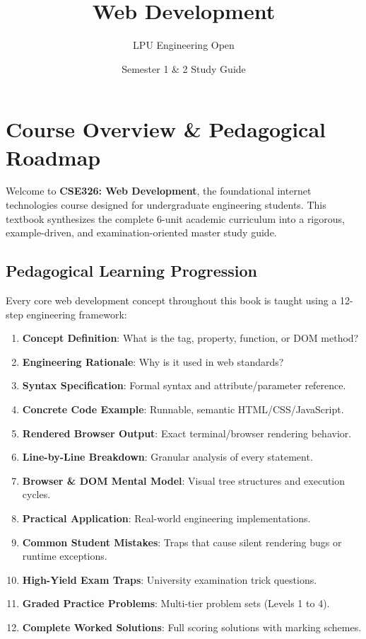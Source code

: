 \documentclass[a4paper,11pt,oneside,openany]{book}
\title{Web Development}
\author{LPU Engineering Open}
\date{Semester 1 \& 2 Study Guide}
\begin{document}
\frontmatter

\makebookcover
\copyrightpage
\disclaimerpage

\chapter*{Course Overview \& Pedagogical Roadmap}

Welcome to \textbf{CSE326: Web Development}, the foundational internet technologies course designed for undergraduate engineering students. This textbook synthesizes the complete 6-unit academic curriculum into a rigorous, example-driven, and examination-oriented master study guide.

\section*{Pedagogical Learning Progression}
Every core web development concept throughout this book is taught using a 12-step engineering framework:
\begin{enumerate}[leftmargin=2em]
    \item \textbf{Concept Definition}: What is the tag, property, function, or DOM method?
    \item \textbf{Engineering Rationale}: Why is it used in web standards?
    \item \textbf{Syntax Specification}: Formal syntax and attribute/parameter reference.
    \item \textbf{Concrete Code Example}: Runnable, semantic HTML/CSS/JavaScript.
    \item \textbf{Rendered Browser Output}: Exact terminal/browser rendering behavior.
    \item \textbf{Line-by-Line Breakdown}: Granular analysis of every statement.
    \item \textbf{Browser \& DOM Mental Model}: Visual tree structures and execution cycles.
    \item \textbf{Practical Application}: Real-world engineering implementations.
    \item \textbf{Common Student Mistakes}: Traps that cause silent rendering bugs or runtime exceptions.
    \item \textbf{High-Yield Exam Traps}: University examination trick questions.
    \item \textbf{Graded Practice Problems}: Multi-tier problem sets (Levels 1 to 4).
    \item \textbf{Complete Worked Solutions}: Full scoring solutions with marking schemes.
\end{enumerate}
\end{document}
